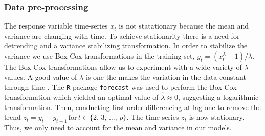       \subsubsection{Data pre-processing}

         The response variable time-series $x_{t}$ is not statationary because the mean and variance are changing with time. To achieve stationarity there is a need for detrending and a variance stabilizing transformation. In order to stabilize the variance we use Box-Cox transformations in the training set, $y_{t} = (x_{t}^{\lambda} - 1) / \lambda$. The Box-Cox transformations allow us to experiment with a wide variety of $\lambda$ values. A good value of $\lambda$ is one the makes the variation in the data constant through time \cite{Watson2025}. The \texttt{R} package \texttt{forecast} was used to perform the Box-Cox transformation which yielded an optimal value of $\hat{\lambda} \approx 0$, suggesting a logarithmic transformation. Then, conducting first-order differencing at lag one to remove the trend $z_{t} = y_{t} - y_{t-1} \, \text{for} \, t \in \{2, \, 3, \, \ldots, \, p\}$. The time series $z_{t}$ is now stationary. Thus, we only need to account for the mean and variance in our models.

